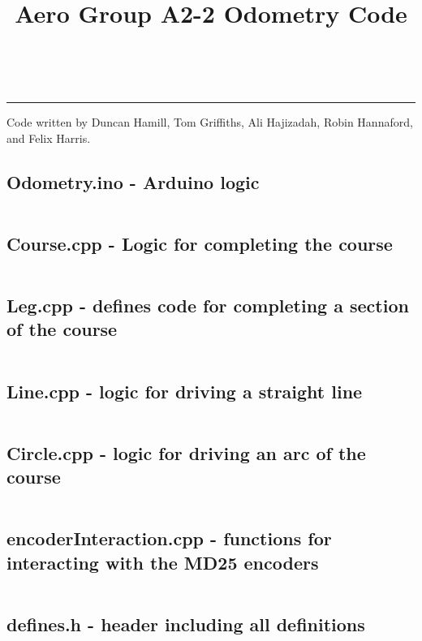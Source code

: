 \documentclass{article}
\title{Aero Group A2-2 Odometry Code}
\makeatletter
\let\Title\@title
\makeatother
\begin{document}
    \begin{center}
        \Large \textbf{\Title} \\[0.8cm]
        \hrule
        \normalsize
    \end{center}

    Code written by Duncan Hamill, Tom Griffiths, Ali Hajizadah, Robin Hannaford, and Felix Harris.

    \subsection*{Odometry.ino - Arduino logic}

    \inputminted[linenos]{cpp}{./Odometry/Odometry.ino}

    \subsection*{Course.cpp - Logic for completing the course}

    \inputminted[linenos]{cpp}{./Odometry/Course.cpp}

    \subsection*{Leg.cpp - defines code for completing a section of the course}

    \inputminted[linenos]{cpp}{./Odometry/Leg.cpp}

    \subsection*{Line.cpp - logic for driving a straight line}

    \inputminted[linenos]{cpp}{./Odometry/Line.cpp}

    \subsection*{Circle.cpp - logic for driving an arc of the course}

    \inputminted[linenos]{cpp}{./Odometry/Circle.cpp}

    \subsection*{encoderInteraction.cpp - functions for interacting with the MD25 encoders}

    \inputminted[linenos]{cpp}{./Odometry/encoderInteraction.cpp}

    \subsection*{defines.h - header including all definitions}

    \inputminted[linenos]{cpp}{./Odometry/defines.h}
    
\end{document}
